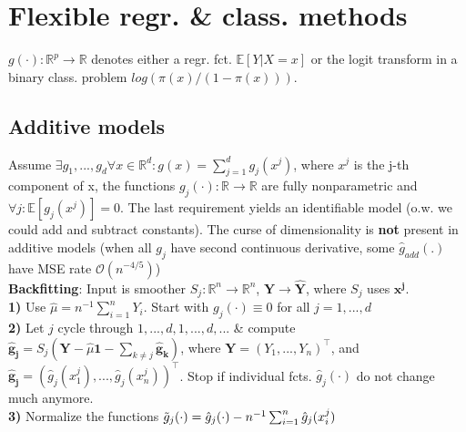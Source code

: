 \section{Flexible regr. \& class. methods}
$g(\cdot): \mathbb{R}^p \to \mathbb{R}$ denotes either a regr. fct. $\mathbb{E}[Y|X=x]$ or the logit transform in a binary class. problem $log\left( \pi(x)/(1-\pi(x)) \right)$.

\subsection*{Additive models}
Assume $\exists g_1,...,g_d \forall x \in \mathbb{R}^d: g(x)=\sum_{j=1}^d g_j(x^j)$, where $x^j$ is the j-th component of x, the functions $g_j(\cdot): \mathbb{R} \to \mathbb{R}$ are fully nonparametric and $\forall j: \mathbb{E}[g_j(x^j)]=0 $. The last requirement yields an identifiable model (o.w. we could add and subtract constants). The curse of dimensionality is \textbf{not} present in additive models (when all $g_j$ have second continuous derivative, some $\hat{g}_{add}(.)$ have MSE rate $\mathcal{O}(n^{-4/5})$)\\
\textbf{Backfitting}: Input is smoother $S_j :\mathbb{R}^n \to \mathbb{R}^n$, $\mathbf{Y} \to \mathbf{\hat{Y}}$, where $S_j$ uses $\mathbf{x^j}$.\\
\textbf{1)} Use $\hat{\mu} = n^{-1}\sum_{i=1}^nY_i$. Start with $g_j(\cdot) \equiv 0$ for all $j=1,...,d$ \\
\textbf{2)} Let $j$ cycle through $1,...,d,1,...,d,...$ \& compute
$\mathbf{\hat{g}_j} = S_j(\mathbf{Y} - \hat{\mu}\mathbf{1} - \sum_{k\neq j} \mathbf{\hat{g}_k})$, where $\mathbf{Y}=(Y_1,...,Y_n)^\intercal$, and $\mathbf{\hat{g}_j}=\left(\hat{g}_j(x_1^j),...,\hat{g}_j(x_n^j)\right)^\intercal$. Stop if individual fcts. $\hat{g}_j(\cdot)$ do not change much anymore. \\
\textbf{3)} Normalize the functions $\Tilde{g}_j(\cdot) = \hat{g}_j(\cdot) - n^{-1} \sum_{i=1}^n\hat{g}_j(x_i^j)$ \\

